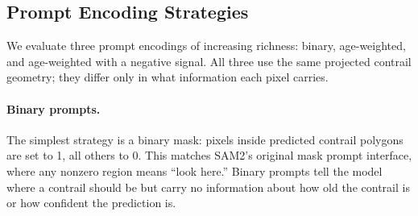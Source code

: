 \documentclass[1p,11pt]{elsarticle}
\begin{document}
\begin{table}[!tbp]
\centering
\caption{CoCiP configuration used for prompt generation, implemented with \texttt{pycontrails}~\cite{pycontrails}.}
\label{tab:cocip_params}
\end{table}

\subsection{Prompt Encoding Strategies}

We evaluate three prompt encodings of increasing richness: binary, age-weighted, and age-weighted with a negative signal. All three use the same projected contrail geometry; they differ only in what information each pixel carries.

\paragraph{Binary prompts.} The simplest strategy is a binary mask: pixels inside predicted contrail polygons are set to 1, all others to 0. This matches SAM2's original mask prompt interface, where any nonzero region means ``look here.'' Binary prompts tell the model where a contrail should be but carry no information about how old the contrail is or how confident the prediction is.
\end{document}
